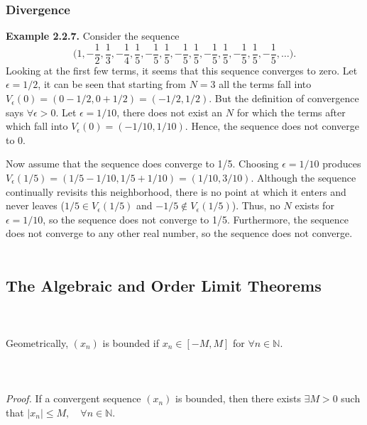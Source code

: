 \documentclass{article}
\begin{document}
            \subsubsection{Divergence}
                \textbf{Example 2.2.7.} Consider the sequence \begin{equation*}
                    \bigg(1,-\frac{1}{2},\frac{1}{3},-\frac{1}{4},\frac{1}{5},-\frac{1}{5},\frac{1}{5},-\frac{1}{5},\frac{1}{5},-\frac{1}{5},\frac{1}{5},-\frac{1}{5},\frac{1}{5},-\frac{1}{5},\dots\bigg).
                \end{equation*}
                Looking at the first few terms, it seems that this sequence converges to zero. Let $\epsilon=1/2$, it can be seen that starting from $N=3$ all the terms fall into $V_\epsilon(0)=(0-1/2,0+1/2)=(-1/2,1/2)$. But the definition of convergence says $\forall \epsilon>0$. Let $\epsilon=1/10$, there does not exist an $N$ for which the terms after which fall into $V_\epsilon(0)=(-1/10,1/10)$. Hence, the sequence does not converge to 0.
                
                Now assume that the sequence does converge to 1/5. Choosing $\epsilon=1/10$ produces $V_\epsilon(1/5)=(1/5-1/10,1/5+1/10)=(1/10,3/10)$. Although the sequence continually revisits this neighborhood, there is no point at which it enters and never leaves ($1/5 \in V_\epsilon(1/5)$ and $-1/5 \notin V_\epsilon(1/5)$). Thus, no $N$ exists for $\epsilon=1/10$, so the sequence does not converge to 1/5. Furthermore, the sequence does not converge to any other real number, so the sequence does not converge.
                \\ \\
            
            \subsection{The Algebraic and Order Limit Theorems}
                \\ \\
                
                Geometrically, $(x_n)$ is bounded if $x_n \in [-M,M]$ for $\forall n \in \mathbb{N}$.
                \\ \\
                \\ \\
                \textit{Proof.} If a convergent sequence $(x_n)$ is bounded, then there exists $\exists M>0$ such that $|x_n| \leq M, \quad \forall n \in \mathbb{N}$.
                
\end{document}
